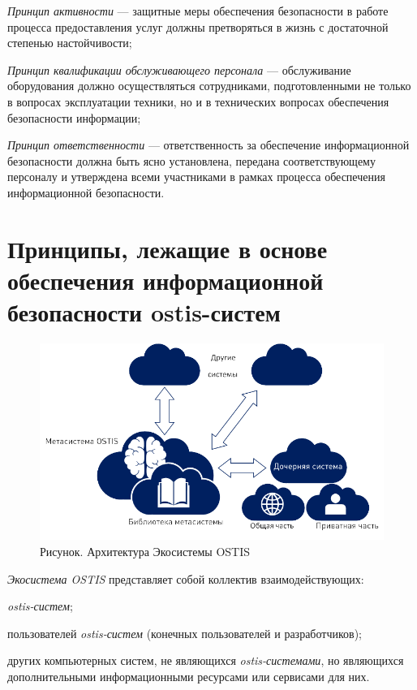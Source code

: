 \begin{textitemize}
	\item \textit{Принцип активности} --- защитные меры обеспечения безопасности в работе процесса предоставления услуг должны претворяться в жизнь с достаточной степенью настойчивости;
	\item \textit{Принцип квалификации обслуживающего персонала} --- обслуживание оборудования должно осуществляться сотрудниками, подготовленными не только в вопросах эксплуатации техники, но и в технических вопросах обеспечения безопасности информации;
	\item \textit{Принцип ответственности} --- ответственность за обеспечение информационной безопасности должна быть ясно установлена, передана соответствующему персоналу и утверждена всеми участниками в рамках процесса обеспечения информационной безопасности.
\end{textitemize}

\section{Принципы, лежащие в основе обеспечения информационной безопасности ostis-систем}
\label{sec_security_principles}

\begin{figure}[H]
	\includegraphics[scale=0.9]{images/part7/chapter_security/ecosystem_security.png}
	\caption{Рисунок. Архитектура Экосистемы OSTIS}
	\label{fig:ecosystem_security}
\end{figure}

\textit{Экосистема OSTIS} представляет собой коллектив взаимодействующих:

\begin{textitemize}
	\item \textit{ostis-систем};
	\item пользователей \textit{ostis-систем} (конечных пользователей и разработчиков);
	\item других компьютерных систем, не являющихся \textit{ostis-системами}, но являющихся дополнительными информационными ресурсами или сервисами для них.
\end{textitemize}

